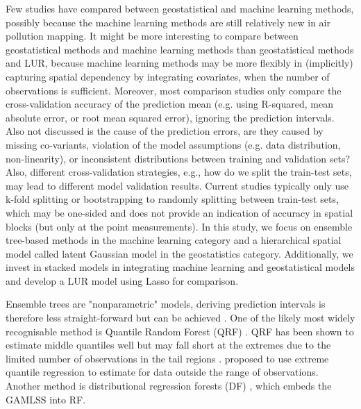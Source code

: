 \documentclass{article}
\begin{document}
Few studies have compared between geostatistical and machine learning methods, possibly because the machine learning methods are still relatively new in air pollution mapping. It might be more interesting to compare between geostatistical methods and machine learning methods than geostatistical methods and LUR, because machine learning methods may be more flexibly in (implicitly) capturing spatial dependency by integrating covariates, when the number of observations is sufficient. Moreover, most comparison studies only compare the cross-validation accuracy of the prediction mean (e.g. using R-squared, mean absolute error, or root mean squared error), ignoring the prediction intervals. Also not discussed is the cause of the prediction errors, are they caused by missing co-variants, violation of the model assumptions (e.g. data distribution, non-linearity), or inconsistent distributions between training and validation sets? Also, different cross-validation strategies, e.g., how do we split the train-test sets, may lead to different model validation results. Current studies typically only use k-fold splitting \citep{kerckhoffs2019performance,larkin2017global,REN2020105827} or bootstrapping \citep{luglobal} to randomly splitting between train-test sets, which may be one-sided and does not provide an indication of accuracy in spatial blocks (but only at the point measurements). In this study, we focus on ensemble tree-based methods in the machine learning category and a hierarchical spatial model \citep{lindgren2011explicit} called latent Gaussian model in the geostatistics category. Additionally, we invest in stacked models in integrating machine learning and geostatistical models and develop a LUR model using Lasso for comparison.  

Ensemble trees are "nonparametric" models, deriving prediction intervals is therefore less straight-forward but can be achieved \citep{meinshausen2006quantile,wager2014confidence,stasinopoulos2007generalized,velthoen2021gradient}. One of the likely most widely recognisable method is Quantile Random Forest (QRF) \citep{meinshausen2006quantile}. QRF has been shown to estimate middle quantiles well but may fall short at the extremes due to the limited number of observations in the tail regions \citep{velthoen2021gradient}. \cite{velthoen2021gradient} proposed to use extreme quantile regression to estimate for data outside the range of observations. Another method is distributional regression forests (DF) \citep{schlosser2019distributional}, which embeds the GAMLSS \citep{stasinopoulos2007generalized} into RF.  
\end{document}
